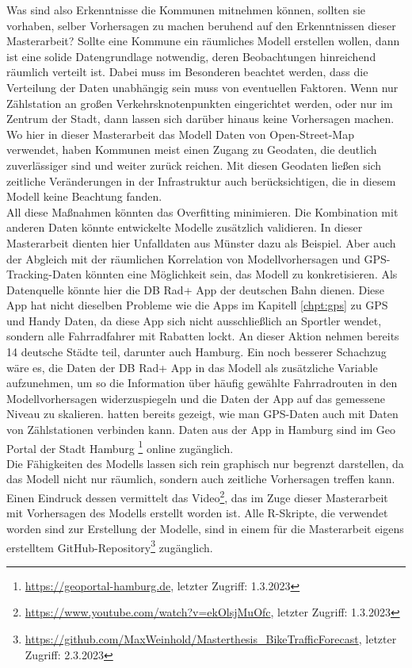 \documentclass[a4paper,12pt]{thesis}
\begin{document}
Was sind also Erkenntnisse die Kommunen mitnehmen können, sollten sie vorhaben, selber Vorhersagen zu machen beruhend auf den Erkenntnissen dieser Masterarbeit? Sollte eine Kommune ein räumliches Modell erstellen wollen, dann ist eine solide Datengrundlage notwendig, deren Beobachtungen hinreichend räumlich verteilt ist. Dabei muss im Besonderen beachtet werden, dass die Verteilung der Daten unabhängig sein muss von eventuellen Faktoren. Wenn nur Zählstation an großen Verkehrsknotenpunkten eingerichtet werden, oder nur im Zentrum der Stadt, dann lassen sich darüber hinaus keine Vorhersagen machen. Wo hier in dieser Masterarbeit das Modell Daten von Open-Street-Map verwendet, haben Kommunen meist einen Zugang zu Geodaten, die deutlich zuverlässiger sind und weiter zurück reichen. Mit diesen Geodaten ließen sich zeitliche Veränderungen in der Infrastruktur auch berücksichtigen, die in diesem Modell keine Beachtung fanden.\\
All diese Maßnahmen könnten das Overfitting minimieren. Die Kombination mit anderen Daten könnte entwickelte Modelle zusätzlich validieren. In dieser Masterarbeit dienten hier Unfalldaten aus Münster dazu als Beispiel. Aber auch der Abgleich mit der räumlichen Korrelation von Modellvorhersagen und GPS-Tracking-Daten könnten eine Möglichkeit sein, das Modell zu konkretisieren. Als Datenquelle könnte hier die DB Rad+ App der deutschen Bahn dienen. Diese App hat nicht dieselben Probleme wie die Apps im Kapitell \ref{chpt:gps} zu GPS und Handy Daten, da diese App sich nicht ausschließlich an Sportler wendet, sondern alle Fahrradfahrer mit Rabatten lockt. An dieser Aktion nehmen bereits 14 deutsche Städte teil, darunter auch Hamburg. Ein noch besserer Schachzug wäre es, die Daten der DB Rad+ App in das Modell als zusätzliche Variable aufzunehmen, um so die Information über häufig gewählte Fahrradrouten in den Modellvorhersagen widerzuspiegeln und die Daten der App auf das gemessene Niveau zu skalieren. \cite{Alattar2021} hatten bereits gezeigt, wie man GPS-Daten auch mit Daten von Zählstationen verbinden kann. Daten aus der App in Hamburg sind im Geo Portal der Stadt Hamburg \footnote{\url{https://geoportal-hamburg.de}, letzter Zugriff: 1.3.2023} online zugänglich.\\

Die Fähigkeiten des Modells lassen sich rein graphisch nur begrenzt darstellen, da das Modell nicht nur räumlich, sondern auch zeitliche Vorhersagen treffen kann. Einen Eindruck dessen vermittelt das Video\footnote{\url{https://www.youtube.com/watch?v=ekOlsjMuOfc}, letzter Zugriff: 1.3.2023}, das im Zuge dieser Masterarbeit mit Vorhersagen des Modells erstellt worden ist. Alle R-Skripte, die verwendet worden sind zur Erstellung der Modelle, sind in einem für die Masterarbeit eigens erstelltem GitHub-Repository\footnote{\url{https://github.com/MaxWeinhold/Masterthesis_BikeTrafficForecast}, letzter Zugriff: 2.3.2023} zugänglich.
\end{document}

